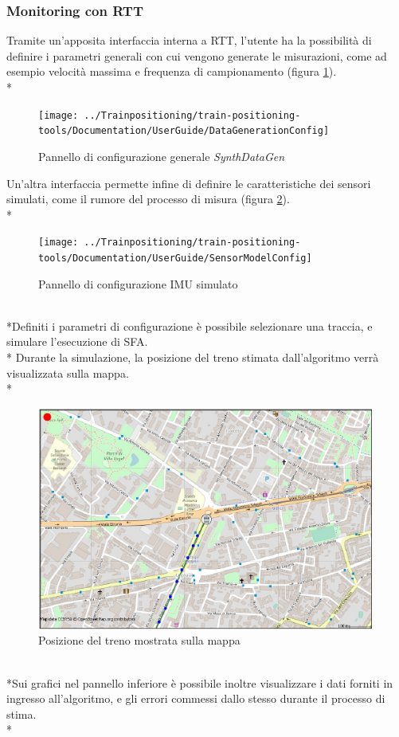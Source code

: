 \subsubsection{Monitoring con RTT}
Tramite un'apposita interfaccia interna a RTT, l'utente ha la possibilit\`a di definire i parametri generali con cui vengono generate le misurazioni, come ad esempio velocit\`a massima e frequenza di campionamento (figura \ref{fig:datagenerationconfig}).\\*
\begin{figure}[h]
	\centering
	\texttt{[image: ../Trainpositioning/train-positioning-tools/Documentation/UserGuide/DataGenerationConfig]}
	\caption{Pannello di configurazione generale \emph{SynthDataGen}}
	\label{fig:datagenerationconfig}
\end{figure}\newpage
Un'altra interfaccia permette infine di definire le caratteristiche dei sensori simulati, come il rumore del processo di misura (figura \ref{fig:imuconfig}).\\*
\begin{figure}[h]
	\centering
	\texttt{[image: ../Trainpositioning/train-positioning-tools/Documentation/UserGuide/SensorModelConfig]}
	\caption{Pannello di configurazione IMU simulato}
	\label{fig:imuconfig}
\end{figure}
\\*Definiti i parametri di configurazione \`e possibile selezionare una traccia, e simulare l'esecuzione di SFA.\\* Durante la simulazione, la posizione del treno stimata dall'algoritmo verr\`a visualizzata sulla mappa.\\*
\begin{figure}[h]
	\centering
	\includegraphics[width=0.7\linewidth]{img/trainmap}
	\caption{Posizione del treno mostrata sulla mappa}
	\label{fig:trainonmap}
\end{figure}
\\*Sui grafici nel pannello inferiore \`e possibile inoltre visualizzare i dati forniti in ingresso all'algoritmo, e gli errori commessi dallo stesso durante il processo di stima.\\*
